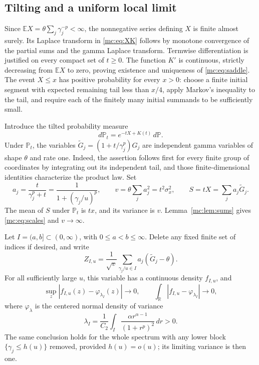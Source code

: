 \subsection{Tilting and a uniform local limit}

Since $\mathbb EX=\theta\sum_j\gamma_j^{-p}<\infty$, the nonnegative
series defining $X$ is finite almost surely.  Its Laplace transform in
\eqref{mc:eq:XK} follows by monotone convergence of the partial sums and
the gamma Laplace transform.  Termwise differentiation is justified on
every compact set of $t\geq0$.  The function $K'$ is continuous, strictly
decreasing from $\mathbb EX$ to zero, proving existence and uniqueness of
\eqref{mc:eq:saddle}.  The event $X\leq x$ has positive probability for
every $x>0$: choose a finite initial segment with expected remaining tail
less than $x/4$, apply Markov's inequality to the tail, and require each
of the finitely many initial summands to be sufficiently small.

Introduce the tilted probability measure
\begin{equation}\label{mc:eq:tilt}
 d\mathbb P_t=e^{-tX+K(t)}\,d\mathbb P.
\end{equation}
Under $\mathbb P_t$, the variables
$\widetilde G_j=(1+t/\gamma_j^p)G_j$ are independent gamma variables
of shape $\theta$ and rate one.  Indeed, the assertion follows first for
every finite group of coordinates by integrating out its independent
tail, and those finite-dimensional identities characterize the product
law.  Set
\begin{equation}\label{mc:eq:av}
 a_j=\frac{t}{\gamma_j^p+t}
     =\frac1{1+(\gamma_j/u)^p},\qquad
 v=\theta\sum_j a_j^2=t^2\sigma_x^2,
 \qquad S=tX=\sum_j a_j\widetilde G_j.
\end{equation}
The mean of $S$ under $\mathbb P_t$ is $tx$, and its variance is $v$.
Lemma~\ref{mc:lem:sums} gives \eqref{mc:eq:scales} and $v\to\infty$.

\begin{lemma}
\label{mc:lem:local}
Let $I=(a,b]\subset(0,\infty)$, with $0\leq a<b\leq\infty$.
Delete any fixed finite set of indices if desired, and write
\[
 Z_{I,u}=\frac1{\sqrt v}
 \sum_{\gamma_j/u\in I}a_j(\widetilde G_j-\theta).
\]
For all sufficiently large $u$, this variable has a continuous density
$f_{I,u}$, and
\begin{equation}\label{mc:eq:local}
 \sup_z|f_{I,u}(z)-\varphi_{\lambda_I}(z)|\longrightarrow0,
 \qquad
 \int_{\mathbb R}|f_{I,u}-\varphi_{\lambda_I}|\longrightarrow0,
\end{equation}
where $\varphi_\lambda$ is the centered normal density of variance
\[
 \lambda_I=\frac1{C_2}
 \int_I\frac{\alpha r^{\alpha-1}}{(1+r^p)^2}\,dr>0.
\]
The same conclusion holds for the whole spectrum with any lower block
$\{\gamma_j\leq h(u)\}$ removed, provided $h(u)=o(u)$; its limiting
variance is then one.
\end{lemma}

